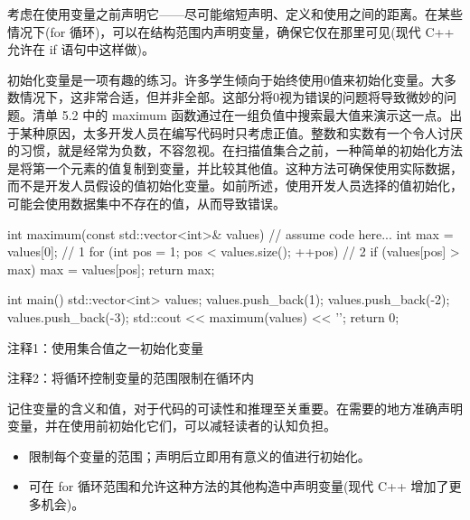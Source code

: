 
考虑在使用变量之前声明它——尽可能缩短声明、定义和使用之间的距离。在某些情况下(for 循环)，可以在结构范围内声明变量，确保它仅在那里可见(现代 C++ 允许在 if 语句中这样做)。

初始化变量是一项有趣的练习。许多学生倾向于始终使用0值来初始化变量。大多数情况下，这非常合适，但并非全部。这部分将0视为错误的问题将导致微妙的问题。清单 5.2 中的 maximum 函数通过在一组负值中搜索最大值来演示这一点。出于某种原因，太多开发人员在编写代码时只考虑正值。整数和实数有一个令人讨厌的习惯，就是经常为负数，不容忽视。在扫描值集合之前，一种简单的初始化方法是将第一个元素的值复制到变量，并比较其他值。这种方法可确保使用实际数据，而不是开发人员假设的值初始化变量。如前所述，使用开发人员选择的值初始化，可能会使用数据集中不存在的值，从而导致错误。


\begin{cpp}
int maximum(const std::vector<int>& values) {
  // assume code here...
  int max = values[0]; // 1
  for (int pos = 1; pos < values.size(); ++pos) // 2
    if (values[pos] > max)
      max = values[pos];
  return max;
}

int main() {
  std::vector<int> values;
  values.push_back(1);
  values.push_back(-2);
  values.push_back(-3);
  std::cout << maximum(values) << '\n';
  return 0;
}
\end{cpp}

{\footnotesize
注释1：使用集合值之一初始化变量

注释2：将循环控制变量的范围限制在循环内
}

记住变量的含义和值，对于代码的可读性和推理至关重要。在需要的地方准确声明变量，并在使用前初始化它们，可以减轻读者的认知负担。


\begin{itemize}
\item
限制每个变量的范围；声明后立即用有意义的值进行初始化。

\item
可在 for 循环范围和允许这种方法的其他构造中声明变量(现代 C++ 增加了更多机会)。
\end{itemize}












